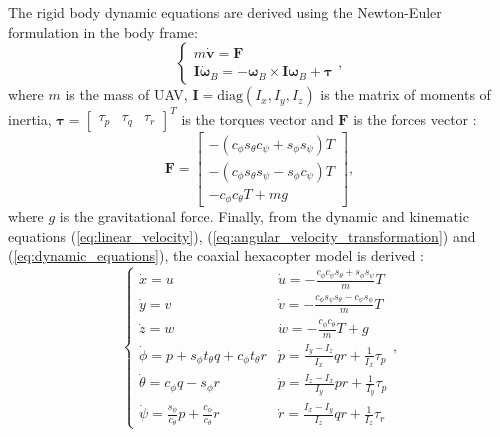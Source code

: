The rigid body dynamic equations are derived using the Newton-Euler formulation in the body
frame:
\begin{equation}
\begin{cases}
m \dot{\mathbf{v}} = \mathbf{F} \\
\mathbf{I} \dot{\boldsymbol{\omega}}_B = -\boldsymbol{\omega}_B \times \mathbf{I} \boldsymbol{\omega}_B + \boldsymbol{\tau}
\end{cases},
\label{eq:dynamic_equations}
\end{equation}
where $m$ is the mass of UAV, $\mathbf{I} = \mathrm{diag}(I_x, I_y, I_z)$ is the matrix of moments of inertia, $\boldsymbol{\tau} = \begin{bmatrix} \tau_p & \tau_q & \tau_r \end{bmatrix}^T$ is the torques vector and $\mathbf{F}$ is the forces vector \cite{Mellinger2011ICRA}:
\begin{equation}
\mathbf{F} = \begin{bmatrix} -\left( c_{\phi} s_{\theta} c_{\psi} + s_{\phi} s_{\psi} \right) T \\ -\left( c_{\phi} s_{\theta} s_{\psi} - s_{\phi} c_{\psi} \right) T \\ -c_{\phi} c_{\theta} T + mg\end{bmatrix},
\label{eq:forces}
\end{equation}
where $g$ is the gravitational force. Finally, from the dynamic and kinematic equations (\ref{eq:linear_velocity}), (\ref{eq:angular_velocity_transformation}) and (\ref{eq:dynamic_equations}), the coaxial hexacopter model is derived \cite{Sarabakha2016CDC}:
\begin{equation}
\begin{cases}
\dot{x} = u & \dot{u} = -\frac{c_{\phi} c_{\psi} s_{\theta} + s_{\phi} s_{\psi}}{m} T \\
\dot{y} = v & \dot{v} = -\frac{c_{\phi} s_{\psi} s_{\theta} - c_{\psi} s_{\phi}}{m} T \\
\dot{z} = w & \dot{w} = -\frac{c_{\phi} c_{\theta}}{m} T + g \\
\dot{\phi} = p + s_{\phi} t_{\theta} q + c_{\phi} t_{\theta} r & \dot{p} =  \frac{I_y - I_z}{I_x} q r + \frac{1}{I_x} \tau_p \\
\dot{\theta} = c_{\phi} q - s_{\phi} r & \dot{p} =  \frac{I_z - I_x}{I_y} p r + \frac{1}{I_y} \tau_p \\
\dot{\psi} = \frac{s_{\phi}}{c_{\theta}} p + \frac{c_{\phi}}{c_{\theta}} r & \dot{r} =  \frac{I_x - I_y}{I_z} q r + \frac{1}{I_z} \tau_r
\end{cases},
\label{eq:model}
\end{equation}

